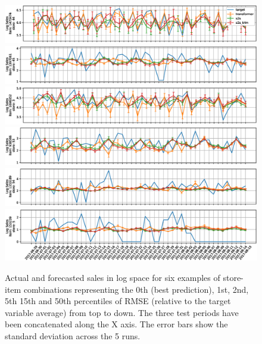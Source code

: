 \documentclass{elsarticle}
\begin{document}
	
	\begin{figure}
		\centering
		\includegraphics[width=1\linewidth]{img/sample_0_log}
		\includegraphics[width=1\linewidth]{img/sample_1_log}
		\includegraphics[width=1\linewidth]{img/sample_2_log}
		\includegraphics[width=1\linewidth]{img/sample_3_log}
		\includegraphics[width=1\linewidth]{img/sample_4_log}
		\includegraphics[width=1\linewidth]{img/sample_5_log}
	\caption{Actual and forecasted sales in log space for six examples of store-item combinations representing the 0th (best prediction), 1st, 2nd, 5th 15th and 50th percentiles of RMSE (relative to the target variable average) from top to down. The three test periods have been concatenated along the X axis. The error bars show the standard deviation across the 5 runs.}
		\label{fig:ts_log}
	\end{figure}
\end{document}

